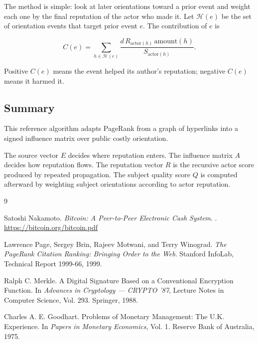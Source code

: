 \documentclass[11pt]{article}
\begin{document}
The method is simple: look at later orientations toward a prior event and weight each one by the final reputation of the actor who made it. Let \(\mathcal{H}(e)\) be the set of orientation events that target prior event \(e\). The contribution of \(e\) is

\[
C(e)
=
\sum_{h \in \mathcal{H}(e)}
\frac{d\,R_{\mathrm{actor}(h)}\,\mathrm{amount}(h)}
{S_{\mathrm{actor}(h)}}.
\]

Positive \(C(e)\) means the event helped its author's reputation; negative \(C(e)\) means it harmed it.

\subsection{Summary}

This reference algorithm adapts PageRank from a graph of hyperlinks into a signed influence matrix over public costly orientation.

The source vector \(E\) decides where reputation enters. The influence matrix \(A\) decides how reputation flows. The reputation vector \(R\) is the recursive actor score produced by repeated propagation. The subject quality score \(Q\) is computed afterward by weighting subject orientations according to actor reputation.

\begin{thebibliography}{9}

Satoshi Nakamoto.
\newblock \textit{Bitcoin: A Peer-to-Peer Electronic Cash System}.
.
\newblock \url{https://bitcoin.org/bitcoin.pdf}

Lawrence Page, Sergey Brin, Rajeev Motwani, and Terry Winograd.
\newblock \textit{The PageRank Citation Ranking: Bringing Order to the Web}.
\newblock Stanford InfoLab, Technical Report 1999-66, 1999.

Ralph C. Merkle.
\newblock A Digital Signature Based on a Conventional Encryption Function.
\newblock In \textit{Advances in Cryptology --- CRYPTO '87}, Lecture Notes in Computer Science, Vol. 293.
\newblock Springer, 1988.

Charles A. E. Goodhart.
\newblock Problems of Monetary Management: The U.K. Experience.
\newblock In \textit{Papers in Monetary Economics}, Vol. 1.
\newblock Reserve Bank of Australia, 1975.

\end{thebibliography}
\end{document}
